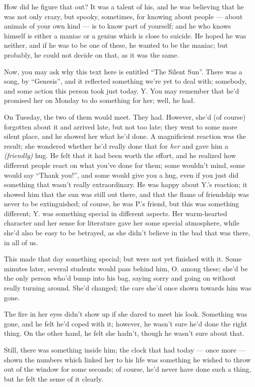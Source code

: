 How did he figure that out? It was a talent of his, and he was believing that he was not only crazy, but spooky, sometimes, for knowing about people --- about animals of your own kind --- is to know part of yourself; and he who knows himself is either a maniac or a genius which is close to suicide. He hoped he was neither, and if he was to be one of these, he wanted to be the maniac; but probably, he could not decide on that, as it was the same.

Now, you may ask why this text here is entitled \enquote{The Silent Sun}. There was a song, by \enquote{Genesis}, and it reflected something we're yet to deal with; somebody, and some action this person took just today. Y. 
You may remember that he'd promised her on Monday to do something for her; well, he had.

On Tuesday, the two of them would meet. They had. However, she'd (of course) forgotten about it and arrived late, but not too late; they went to some more silent place, and he showed her what he'd done. 
A magnificient reaction was the result; she wondered whether he'd really done that for \emph{her} and gave him a \emph{(friendly)} hug. He felt that it had been worth the effort, and he realized how different people react on what you've done for them; some wouldn't mind, some would say \enquote{Thank you!}, and some would give you a hug, even if you just did something that wasn't really extraordinary. He was happy about Y.'s reaction; it showed him that the sun was still out there, and that the flame of friendship was never to be extinguished; of course, he was P.'s friend, but this was something different; Y. was something special in different aspects. Her warm-hearted character and her sense for literature gave her some special atmosphere, while she'd also be easy to be betrayed, as she didn't believe in the bad that was there, in all of us.

This made that day something special; but were not yet finished with it. Some minutes later, several students would pass behind him, O. among these; she'd be the only person who'd bump into his bag, saying sorry and going on without really turning around. She'd changed; the care she'd once shown towards him was gone.

The fire in her eyes didn't show up if she dared to meet his look. Something was gone, and he felt he'd coped with it; however, he wasn't sure he'd done the right thing. On the other hand, he felt she hadn't, though he wasn't sure about that.

Still, there was something inside him; the clock that had today --- once more --- shown the numbers which linked her to his life was something he wished to throw out of the window for some seconds; of course, he'd never have done such a thing, but he felt the sense of it clearly.

